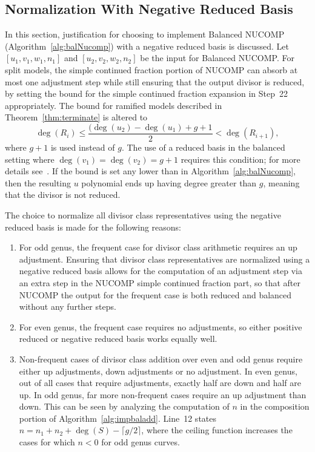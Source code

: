 \subsection{Normalization With Negative Reduced Basis}\label{sec:negreduced} In
this section, justification for choosing to implement Balanced NUCOMP
(Algorithm~\ref{alg:balNucomp}) with a negative reduced basis is discussed. Let
$[u_1,v_1,w_1,n_1]$ and $[u_2,v_2,w_2,n_2]$ be the input for Balanced NUCOMP.
For split models, the simple continued fraction portion of NUCOMP can absorb at
most one adjustment step while still ensuring that the output divisor is
reduced, by setting the bound for the simple continued fraction expansion in
Step~22 appropriately. The bound for ramified models described in
Theorem~\ref{thm:terminate} is altered to $$\deg(R_i) \leq \frac{(\deg(u_2) -
\deg(u_1) + g + 1}{2} < \deg(R_{i+1}),$$ where $g+1$ is used instead of $g$. The
use of a reduced basis in the balanced setting where $\deg(v_1) = \deg(v_2) =
g+1$ requires this condition; for more details
see~\cite[Section~7]{jacobson_fast_2007}. If the bound is set any lower than in
Algorithm~\ref{alg:balNucomp}, then the resulting $u$ polynomial ends up having
degree greater than $g$, meaning that the divisor is not reduced.

The choice to normalize all divisor class representatives using the negative
reduced basis is made for the following reasons:
\begin{enumerate}
    \item For odd genus, the frequent case for divisor class arithmetic requires
    an up adjustment.  Ensuring that divisor class representatives are
    normalized using a negative reduced basis allows for the computation of an
    adjustment step via an extra step in the NUCOMP simple continued fraction
    part, so that after NUCOMP the output for the frequent case is both reduced
    and balanced without any further steps.
    
    \item For even genus, the frequent case requires no adjustments, so either
    positive reduced or negative reduced basis works equally well.
    
    \item Non-frequent cases of divisor class addition over even and odd genus
    require either up adjustments, down adjustments or no adjustment. In even
    genus, out of all cases that require adjustments, exactly half are down and
    half are up. In odd genus, far more non-frequent cases require an up
    adjustment than down. This can be seen by analyzing the computation of $n$
    in the composition portion of Algorithm~\ref{alg:impbaladd}. Line~12 states
    $n = n_1 + n_2 + \deg(S) - \lceil g/2 \rceil$, where the ceiling function
    increases the cases for which $n < 0$ for odd genus curves.
\end{enumerate}

